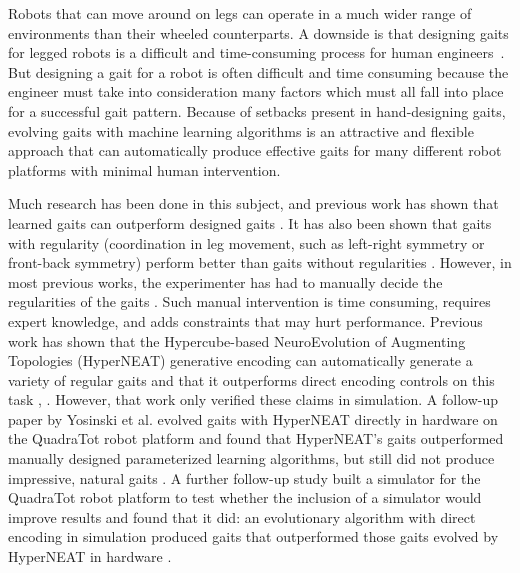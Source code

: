 Robots that can move around on legs can operate in a much wider range of environments than their wheeled counterparts. A downside is that designing gaits for legged robots is a difficult and time-consuming process for human engineers~\cite{ridder storm, wetter green}. 
But designing a gait for a robot is often difficult and time consuming because the engineer must take into consideration many factors which must all fall into place for a successful gait pattern. 
Because of setbacks present in hand-designing gaits, evolving gaits with machine learning algorithms is an attractive and flexible approach that can automatically produce effective gaits for many different robot platforms with minimal human intervention. 

Much research has been done in this subject, and previous work has shown that learned gaits can outperform designed gaits \cite{valsalam:mii,kohl:stone,hornby1,hornby2}. %
It has also been shown that gaits with regularity (coordination in leg movement, such as left-right symmetry or front-back symmetry) perform better than gaits without regularities \cite{valsalam:mii,clune2,clune1,clune3}. %
However, in most previous works, the experimenter has had to manually decide the regularities of the gaits \cite{valsalam:mii,tellez,beer,raibert} . %
Such manual intervention is time consuming, requires expert knowledge, and adds constraints that may hurt performance. 
Previous work has shown that the Hypercube-based NeuroEvolution of Augmenting Topologies (HyperNEAT) generative encoding \cite{stanley1} can automatically generate a variety of regular gaits and that it outperforms direct encoding controls on this task \cite{clune1}, \cite{clune2}. 
However, that work only verified these claims in simulation. 
A follow-up paper by Yosinski et al. evolved gaits with HyperNEAT directly in hardware on the QuadraTot robot platform and found that HyperNEAT's gaits outperformed manually designed parameterized learning algorithms, but still did not produce impressive, natural gaits \cite{yos:clune}. 
A further follow-up study built a simulator for the QuadraTot robot platform to test whether the inclusion of a simulator would improve results and found that it did:  an evolutionary algorithm with direct encoding in simulation produced gaits that outperformed those gaits evolved by HyperNEAT in hardware \cite{glette}. %
